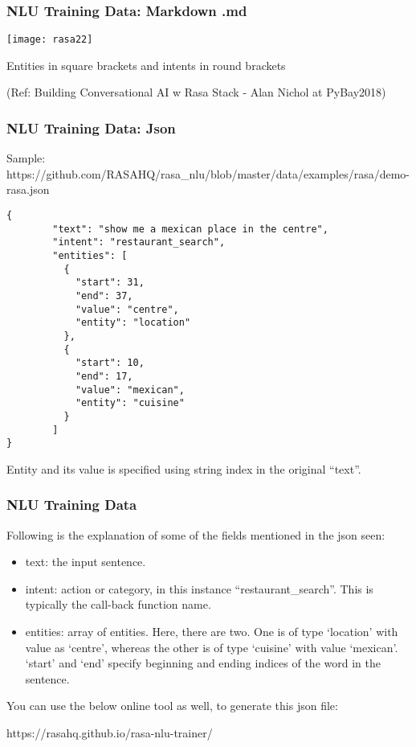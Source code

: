  \begin{frame}[fragile]\frametitle{NLU Training Data: Markdown .md}

\begin{center}
\texttt{[image: rasa22]}
\end{center}

Entities in square brackets and intents in round brackets

{\tiny (Ref: Building Conversational AI w Rasa Stack - Alan Nichol at PyBay2018)}

\end{frame}



 \begin{frame}[fragile]\frametitle{NLU Training Data: Json}
 
Sample: https://github.com/RASAHQ/rasa\_nlu/blob/master/data/examples/rasa/demo-rasa.json
\begin{lstlisting}
{
        "text": "show me a mexican place in the centre",
        "intent": "restaurant_search",
        "entities": [
          {
            "start": 31,
            "end": 37,
            "value": "centre",
            "entity": "location"
          },
          {
            "start": 10,
            "end": 17,
            "value": "mexican",
            "entity": "cuisine"
          }
        ]
}
\end{lstlisting}
Entity and its value is specified using string index in the original ``text''.
\end{frame}

 \begin{frame}[fragile]\frametitle{NLU Training Data}
 Following is the explanation of some of the fields mentioned in the json seen:
\begin{itemize}
\item text: the input sentence.
\item intent: action or category, in this instance ``restaurant\_search''. This is typically the call-back function name.
\item entities: array of entities. Here, there are two. One is of type `location' with value as `centre', whereas the other is of type `cuisine' with value `mexican'. `start' and `end' specify beginning and ending indices of the word in the sentence.
\end{itemize}
You can use the below online tool as well, to generate this json file:

https://rasahq.github.io/rasa-nlu-trainer/
\end{frame}



